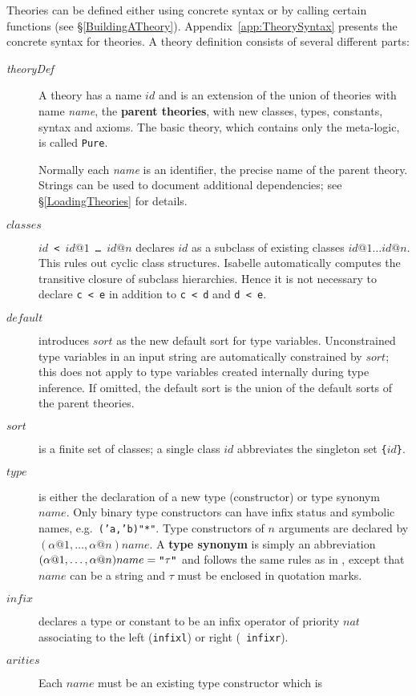 Theories can be defined either using concrete syntax or by calling certain
\ML{} functions (see \S\ref{BuildingATheory}).  Appendix~\ref{app:TheorySyntax}
presents the concrete syntax for theories.  A theory definition consists of
several different parts: 
\begin{description} 
\item[{\it theoryDef}] A theory has a name $id$ and is an extension of the
  union of theories with name {\it name}, the {\bf parent
    theories}, with new classes, types, constants,
  syntax and axioms.  The basic theory, which contains only the meta-logic,
  is called {\tt Pure}.

  Normally each {\it name\/} is an identifier, the precise name of the parent
  theory. Strings can be used to document additional dependencies; see
  \S\ref{LoadingTheories} for details.
\item[$classes$] {\tt$id$ < $id@1$ \dots\ $id@n$} declares $id$ as a subclass
  of existing classes $id@1\dots id@n$.  This rules out cyclic class
  structures.  Isabelle automatically computes the transitive closure of
  subclass hierarchies.  Hence it is not necessary to declare {\tt c < e} in
  addition to {\tt c < d} and {\tt d < e}.
\item[$default$] introduces $sort$ as the new default sort for type
  variables.  Unconstrained type variables in an input string are
  automatically constrained by $sort$; this does not apply to type variables
  created internally during type inference.  If omitted, the default sort is
  the union of the default sorts of the parent theories.
\item[$sort$] is a finite set of classes; a single class $id$ abbreviates the
  singleton set {\tt\{}$id${\tt\}}.
\item[$type$] is either the declaration of a new type (constructor) or type
  synonym $name$. Only binary type constructors can have infix status and
  symbolic names, e.g.\ {\tt ('a,'b)"*"}. Type constructors of $n$ arguments
  are declared by $(\alpha@1,\dots,\alpha@n)name$.  A {\bf type
    synonym} is simply an abbreviation
  $(\alpha@1,\dots,\alpha@n)name = \mbox{\tt"}\tau\mbox{\tt"}$ and follows
  the same rules as in \ML, except that $name$ can be a string and $\tau$
  must be enclosed in quotation marks.
\item[$infix$] declares a type or constant to be an infix operator of
  priority $nat$ associating to the left ({\tt infixl}) or right ({\tt
    infixr}).
\item[$arities$] Each $name$ must be an existing type constructor which is

\end{description}
